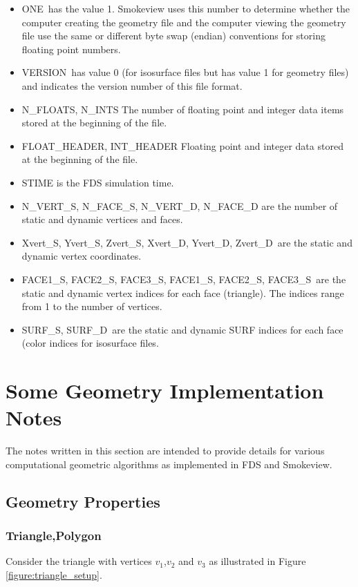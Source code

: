 \documentclass[12pt]{article}
\begin{document}
\begin{itemize}
\item {\ct ONE}\ has the value 1. Smokeview uses this number to determine whether the computer creating the geometry file and the computer viewing the geometry file use the same or different byte swap (endian) conventions for storing floating point numbers.
\item {\ct VERSION}\ has value 0 (for isosurface files but has value 1 for geometry files) and indicates the version number of this file format.
\item {\ct N\_FLOATS, N\_INTS} The number of floating point and integer data items stored at the beginning of the file.
\item {\ct FLOAT\_HEADER, INT\_HEADER} Floating point and integer data stored at the beginning of the file.
\item {\ct STIME} is the FDS simulation time.
\item {\ct N\_VERT\_S, N\_FACE\_S, N\_VERT\_D, N\_FACE\_D} are the number of static and dynamic vertices and faces.
\item {\ct Xvert\_S, Yvert\_S, Zvert\_S, Xvert\_D, Yvert\_D, Zvert\_D}\ are the static and dynamic vertex coordinates.
\item {\ct FACE1\_S, FACE2\_S, FACE3\_S, FACE1\_S, FACE2\_S, FACE3\_S}\ are the static and dynamic vertex indices for each face (triangle).
    The indices range from 1 to the number of vertices.
\item {\ct SURF\_S, SURF\_D}\ are the static and dynamic SURF indices for each face (color indices for isosurface files.
\end{itemize}

\section{Some Geometry Implementation Notes}
The notes written in this section are intended to provide details for various computational geometric algorithms as implemented in FDS and Smokeview.

\subsection{Geometry Properties}
\subsubsection{Triangle,Polygon}
Consider the triangle with vertices $v_1$,$v_2$ and $v_3$ as illustrated in Figure \ref{figure:triangle_setup}.
\end{document}
